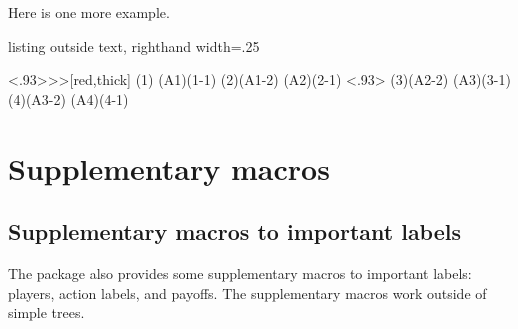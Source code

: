 Here is one more example.

\begin{tcblisting}{listing outside text, righthand width=.25\linewidth}
\begin{istgame}
\cntmdistance*{8mm}{16mm}
\xtShowArrows
{}
\setxtarrowtips<.93>{>>}[red,thick]
\cntmAistb[->-]
\istrootcntmA(1)          \istbA[-x-] \endist
\istroot(A1)(1-1)  \istb  \istb  \endist
\cntmAistb[->-]
\istrootcntmA(2)(A1-2)    \istbA[-o-] \endist
\istroot(A2)(2-1)  \istb  \istb  \endist
\setxtarrowtips<.93>
\cntmAistb[->-]
\istrootcntmA(3)(A2-2)    \istbA[-x-] \endist
\istroot(A3)(3-1)  \istb  \istb  \endist
\cntmAistb[->-]
\istrootcntmA(4)(A3-2)    \istbA[-o-] \endist
\istroot(A4)(4-1)  \istb  \istb  \endist
\end{istgame}
\end{tcblisting}


\section{Supplementary macros}

\label{sec:suppmac}

\subsection{Supplementary macros to important labels}

\label{ssec:suppmac}

The  package also provides some supplementary macros to important labels: players, action labels, and payoffs. The supplementary macros work outside of simple trees.

